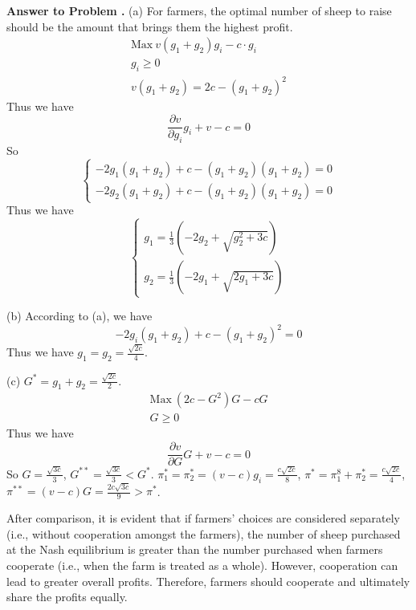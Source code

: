 \documentclass[12pt, english]{article}
\newcounter{answername}
\newenvironment{answer}{\stepcounter{answername}\par\noindent\textbf{Answer to Problem \arabic{answername}.\newline}}{\\\par\bigskip}
\begin{document}
\begin{answer}
	\noindent (a) For farmers, the optimal number of sheep to raise should be the amount that brings them the highest profit.
	$$
	\begin{array}{c}
		\text{Max}\ v(g_1+g_2)g_i-c\cdot g_i
		\\
		g_i \geq 0
		\\
		v(g_1+g_2)=2c-(g_1+g_2)^2
	\end{array}
	$$
	Thus we have
	$$
	\frac{\partial v}{\partial g_i}g_i+v-c=0
	$$
	So
	$$
	\begin{cases}
		-2g_1(g_1+g_2)+c-(g_1+g_2)(g_1+g_2)=0
		\\
		-2g_2(g_1+g_2)+c-(g_1+g_2)(g_1+g_2)=0
	\end{cases}
	$$
	Thus we have
	$$
	\begin{cases}
		g_1=\frac{1}{3}(-2g_2+\sqrt{g_2^2+3c})
		\\
		g_2=\frac{1}{3}(-2g_1+\sqrt{2g_1+3c})
	\end{cases}
	$$
	
	\noindent (b) According to (a), we have
	$$
	-2g_i(g_1+g_2)+c-(g_1+g_2)^2=0
	$$
	Thus we have $g_1=g_2=\frac{\sqrt{2c}}{4}$.
	
	\noindent (c) $G^*=g_1+g_2=\frac{\sqrt{2c}}{2}$.
	$$
		\begin{array}{c}
		\text{Max}\ (2c-G^2)G-cG
		\\
		G \geq 0
	\end{array}
	$$
	Thus we have 
	$$
	\frac{\partial v}{\partial G}G+v-c=0
	$$
	So $G=\frac{\sqrt{3c}}{3}$, $G^{**}=\frac{\sqrt{3c}}{3}<G^*$.
	$\pi_1^*=\pi_2^*=(v-c)g_i=\frac{c\sqrt{2c}}{8}$, $\pi^*=\pi_1^8+\pi_2^*=\frac{c\sqrt{2c}}{4}$, $\pi^{**}=(v-c)G=\frac{2c\sqrt{3c}}{9}>\pi^*$.
	
	After comparison, it is evident that if farmers' choices are considered separately (i.e., without cooperation amongst the farmers), the number of sheep purchased at the Nash equilibrium is greater than the number purchased when farmers cooperate (i.e., when the farm is treated as a whole). However, cooperation can lead to greater overall profits. Therefore, farmers should cooperate and ultimately share the profits equally.
\end{answer}
\end{document}
